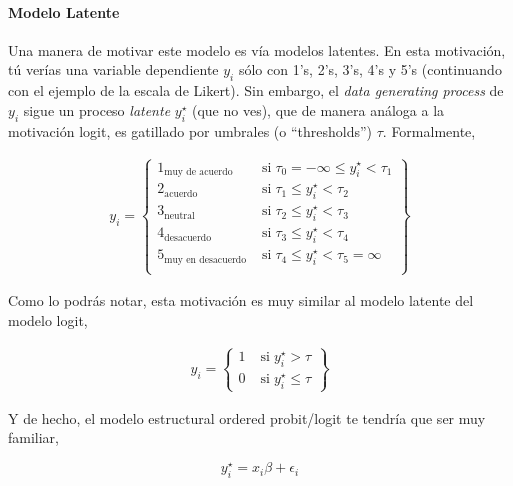 \documentclass[onesided]{article}\usepackage[]{graphicx}\usepackage[]{color}
\begin{document}
\paragraph{Modelo Latente} Una manera de motivar este modelo es v\'ia modelos latentes. En esta motivaci\'on, t\'u ver\'ias una variable dependiente $y_{i}$ s\'olo con 1's, 2's, 3's, 4's y 5's (continuando con el ejemplo de la escala de Likert). Sin embargo, el \emph{data generating process} de $y_{i}$ sigue un proceso \emph{latente} $y_{i}^{\star}$ (que no ves), que de manera an\'aloga a la motivaci\'on logit, es gatillado por umbrales (o ``thresholds'') $\tau$. Formalmente, 


\begin{equation}\label{latente}
\begin{split}
y_{i}=  
  \begin{Bmatrix} 
    1_{\text{muy de acuerdo}} & \;\text{si}\; \tau_{0} = -\infty \leq y_{i}^{\star} < \tau_{1} \\ 
    2_{\text{acuerdo}} & \;\text{si}\; \tau_{1}   \leq y_{i}^{\star} < \tau_{2} \\ 
    3_{\text{neutral}} & \;\text{si}\; \tau_{2}   \leq y_{i}^{\star} < \tau_{3} \\ 
    4_{\text{desacuerdo}} & \;\text{si}\; \tau_{3}   \leq y_{i}^{\star} < \tau_{4} \\ 
    5_{\text{muy en desacuerdo}} & \;\text{si}\; \tau_{4}   \leq y_{i}^{\star} < \tau_{5} = \infty \\ 
  \end{Bmatrix}
\end{split}
\end{equation}

Como lo podr\'as notar, esta motivaci\'on es muy similar al modelo latente del modelo logit,

\begin{equation}\label{logit}
\begin{split}
y_{i}=  
  \begin{Bmatrix} 
    1 & \;\text{si}\; y_{i}^{\star}>\tau \\ 
    0 & \;\text{si}\; y_{i}^{\star}\le\tau 
  \end{Bmatrix}
\end{split}
\end{equation}

Y de hecho, el modelo estructural ordered probit/logit te tendr\'ia que ser muy familiar,

\begin{equation}\label{logit.structural}
y_{i}^{\star} = x_{i}\beta + \epsilon_{i}
\end{equation}
\end{document}
